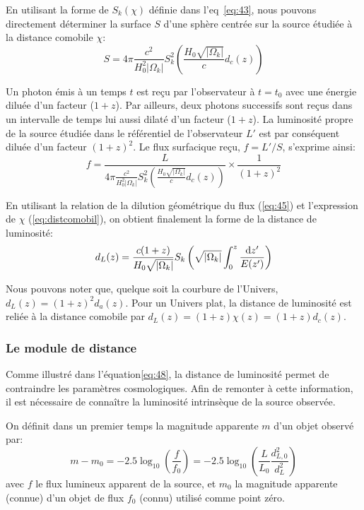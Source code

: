 \documentclass[../main/main.tex]{subfiles}
\begin{document}
En utilisant la forme de $S_{k}(\chi)$ définie dans l'eq~\ref{eq:43},
nous pouvons directement déterminer la surface $S$ d'une sphère centrée
sur la source étudiée à la distance comobile $\chi$:
\begin{equation}
  \label{eq:spheredistlum}
  S=4\pi
  \frac{c^{2}}{H_{0}^{2}\lvert\Omega_{k}\rvert}S_{k}^{2}\left( \frac{H_{0}\sqrt{\lvert\Omega_{k}\rvert}}{c}d_{c}(z)\right)
\end{equation}

Un photon émis à un temps $t$ est reçu par l'observateur à $t=t_{0}$
avec une énergie diluée d'un facteur ($1+z$). Par ailleurs, deux photons
successifs sont reçus dans un intervalle de temps lui aussi dilaté
d'un facteur ($1+z$). La luminosité propre de la source étudiée dans le
référentiel de l'observateur $L'$ est par conséquent diluée d'un facteur
$(1+z)^{2}$. Le flux surfacique reçu, $f=L'/S$, s'exprime ainsi:
\begin{equation}
  \label{eq:47}
  f=\frac{L}{4\pi
  \frac{c^{2}}{H_{0}^{2}\lvert\Omega_{k}\rvert}S_{k}^{2}\left( \frac{H_{0}\sqrt{\lvert\Omega_{k}\rvert}}{c}d_{c}(z)\right)}\times\frac{1}{(1+z)^{2}}
\end{equation}

En utilisant la relation de la dilution géométrique du flux
(\ref{eq:45}) et l'expression de $\chi$ (\ref{eq:distcomobil}), on
obtient finalement la forme de la distance de luminosité:
\begin{equation}
  \label{eq:48}
  d_{L}(z) = \frac{c(1+z)}{H_{0}\sqrt{\lvert\Omega_{k}\rvert}}S_{k}\left(\sqrt{\lvert\Omega_{k}\rvert}\int_{0}^{z}\frac{\mathrm{d} z'}{E(z')}\right)
\end{equation}

Nous pouvons noter que, quelque soit la courbure de l'Univers,
$d_{L}(z)=(1+z)^{2}d_{a}(z)$. Pour un Univers plat, la
distance de luminosité est reliée à la distance comobile par
$d_{L}(z)=(1+z)\chi(z)=(1+z)d_{c}(z)$.

\subsubsection*{Le module de distance}
Comme illustré dans l'équation\ref{eq:48}, la distance de luminosité
permet de contraindre les paramètres cosmologiques. Afin de remonter à
cette information, il est nécessaire de connaître la luminosité
intrinsèque de la source observée.

On définit dans un premier temps la magnitude apparente $m$ d'un objet
observé par:
\begin{equation}
  \label{eq:magapp}
  m-m_{0}=-2.5\log_{10}\left(\frac{f}{f_{0}}\right) = -2.5\log_{10}\left(\frac{L}{L_{0}}\frac{d_{L,0}^{2}}{d_{L}^{2}}\right)
\end{equation}
avec $f$ le flux lumineux apparent de la source, et $m_{0}$ la magnitude
apparente (connue) d'un objet de flux $f_{0}$ (connu) utilisé comme
point zéro.
\end{document}

